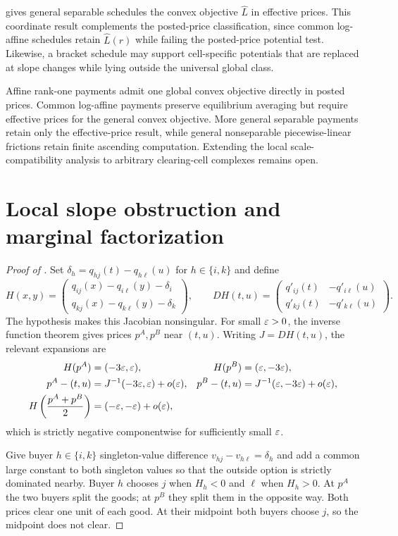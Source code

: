  gives general separable schedules the convex objective $\widehat L$ in effective prices. This coordinate result complements the posted-price classification, since common log-affine schedules retain $\widehat L(r)$ while failing the posted-price potential test. Likewise, a bracket schedule may support cell-specific potentials that are replaced at slope changes while lying outside the universal global class.

Affine rank-one payments admit one global convex objective directly in posted prices. Common log-affine payments preserve equilibrium averaging but require effective prices for the general convex objective. More general separable payments retain only the effective-price result, while general nonseparable piecewise-linear frictions retain finite ascending computation. Extending the local scale-compatibility analysis to arbitrary clearing-cell complexes remains open.
\clearpage
\appendix
\renewcommand{\thelemma}{\Alph{section}.\arabic{lemma}}
\setcounter{table}{0}
\setcounter{figure}{0}

\section{Local slope obstruction and marginal factorization}\label{app:factorization}

\begin{proof}[Proof of ]
Set $\delta_h=q_{hj}(t)-q_{h\ell}(u)$ for $h\in\{i,k\}$ and define
\begin{equation}\label{eq:H-smooth}
H(x,y)=
\begin{pmatrix}
q_{ij}(x)-q_{i\ell}(y)-\delta_i\\
q_{kj}(x)-q_{k\ell}(y)-\delta_k
\end{pmatrix},
\qquad
DH(t,u)=
\begin{pmatrix}
q'_{ij}(t)&-q'_{i\ell}(u)\\
q'_{kj}(t)&-q'_{k\ell}(u)
\end{pmatrix}.
\end{equation}
The hypothesis makes this Jacobian nonsingular. For small $\varepsilon>0$, the inverse function theorem gives prices $p^A,p^B$ near $(t,u)$. Writing $J=DH(t,u)$, the relevant expansions are
\begin{align*}
H(p^A)&=(-3\varepsilon,\varepsilon),
&H(p^B)&=(\varepsilon,-3\varepsilon),\\
p^A-(t,u)&=J^{-1}(-3\varepsilon,\varepsilon)+o(\varepsilon),
&p^B-(t,u)&=J^{-1}(\varepsilon,-3\varepsilon)+o(\varepsilon),\\
H\left(\frac{p^A+p^B}{2}\right)&=(-\varepsilon,-\varepsilon)+o(\varepsilon),
\end{align*}
which is strictly negative componentwise for sufficiently small $\varepsilon$.

Give buyer $h\in\{i,k\}$ singleton-value difference $v_{hj}-v_{h\ell}=\delta_h$ and add a common large constant to both singleton values so that the outside option is strictly dominated nearby. Buyer $h$ chooses $j$ when $H_h<0$ and $\ell$ when $H_h>0$. At $p^A$ the two buyers split the goods; at $p^B$ they split them in the opposite way. Both prices clear one unit of each good. At their midpoint both buyers choose $j$, so the midpoint does not clear.
\end{proof}

